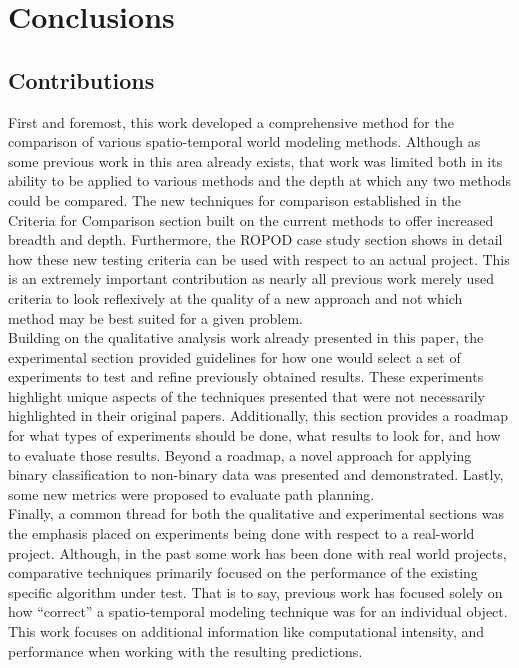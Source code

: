 

    \chapter{Conclusions}

    \section{Contributions}

    First and foremost, this work developed a comprehensive method for the
    comparison of various spatio-temporal world modeling methods. Although as
    some previous work in this area
    already exists, that work was limited both in its ability to be applied to various
    methods and the depth at which any two methods could be compared. The
    new techniques for comparison established in the Criteria for Comparison
    section built on the current methods to offer increased breadth and depth.
    Furthermore, the ROPOD case study section shows in detail how these new testing criteria
    can be used with respect to an actual project. This is an extremely important
    contribution as nearly all previous work merely used criteria to look reflexively
    at the quality of a new approach and not which method may be
    best suited for a given problem. \\

    Building on the qualitative analysis work already presented in this
    paper, the experimental section provided guidelines for how one would select
    a set of experiments to test and refine previously obtained results.
    These experiments highlight unique aspects of the techniques presented that
    were not necessarily highlighted in their original papers.
    Additionally, this section provides a roadmap for what types of experiments
    should be done, what results to look for, and how to evaluate those results.
    Beyond a roadmap, a novel approach for applying binary classification to
    non-binary data was presented and demonstrated. Lastly, some new metrics
    were proposed to evaluate path planning. \\

    Finally, a common thread for both the qualitative and experimental
    sections was the emphasis placed on experiments being done with respect to a
    real-world project. Although, in the past some work has been done with real
    world projects, comparative techniques primarily focused on
    the performance of the existing specific algorithm under test. That is to say, previous work has
    focused solely on how ``correct'' a spatio-temporal modeling technique was
    for an individual object. This work focuses on additional information like
    computational intensity, and performance when working with the
    resulting predictions. \\

